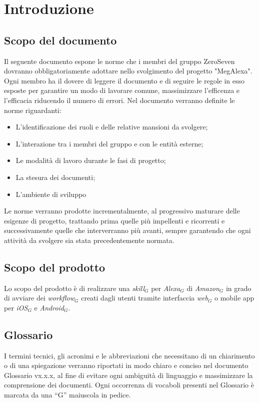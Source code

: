 \newpage
\section{Introduzione}
\subsection{Scopo del documento}
Il seguente documento espone le norme che i membri del gruppo ZeroSeven dovranno obbligatoriamente adottare nello svolgimento del progetto "MegAlexa".
Ogni membro ha il dovere di leggere il documento e di seguire le regole in esso esposte per garantire  un modo di lavorare comune, massimizzare l'efficenza e l'efficacia riducendo il numero di errori.
Nel documento verranno definite le  norme riguardanti:
\begin{itemize}
		\item L'identificazione dei ruoli e delle relative mansioni da svolgere;
		\item L'interazione tra i membri del gruppo e con le entità esterne;
		\item Le modalità di lavoro durante le fasi di progetto;
		\item La stesura dei documenti;
		\item L'ambiente di sviluppo
\end{itemize}
Le norme verranno prodotte incrementalmente, al progressivo maturare delle esigenze di progetto, trattando prima quelle più impellenti e ricorrenti e successivamente quelle che interverranno più avanti, sempre garantendo che ogni attività da svolgere sia stata precedentemente normata.

\subsection{Scopo del prodotto}
Lo scopo del prodotto è di realizzare una \textit{skill$_{G}$} per \textit{Alexa$_{G}$} di \textit{Amazon$_{G}$} in grado di avviare dei \textit{workflow$_{G}$} creati dagli utenti tramite interfaccia \textit{web$_{G}$} o mobile app per \textit{iOS$_{G}$} e \textit{Android$_{G}$}.

\subsection{Glossario}
I termini tecnici, gli acronimi e le abbreviazioni che necessitano di un chiarimento
o di una spiegazione verranno riportati in modo chiaro e conciso nel
documento Glossario vx.x.x, al fine di evitare ogni ambiguità di linguaggio
e massimizzare la comprensione dei documenti. Ogni occorrenza di vocaboli
presenti nel Glossario è marcata da una “G” maiuscola in pedice.

